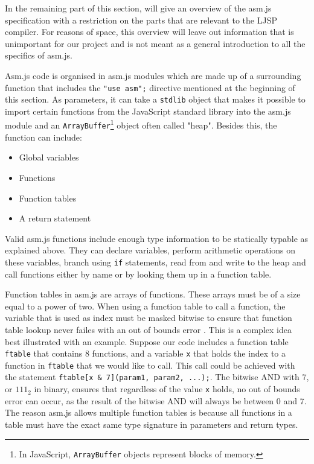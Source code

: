 \documentclass[11pt]{report}
\begin{document}
In the remaining part of this section, will give an overview of the asm.js specification with a restriction on the parts that are relevant to the LJSP compiler. For reasons of space, this overview will leave out information that is unimportant for our project and is not meant as a general introduction to all the specifics of asm.js.

Asm.js code is organised in asm.js modules which are made up of a surrounding function that includes the \texttt{"use asm";} directive mentioned at the beginning of this section. As parameters, it can take a \texttt{stdlib} object that makes it possible to import certain functions from the JavaScript standard library into the asm.js module and an \texttt{ArrayBuffer}\footnote{In JavaScript, \texttt{ArrayBuffer} objects represent blocks of memory.} object often called "heap". Besides this, the function can include:
\begin{itemize}
\item Global variables
\item Functions
\item Function tables
\item A return statement
\end{itemize}

Valid asm.js functions include enough type information to be statically typable as explained above. They can declare variables, perform arithmetic operations on these variables, branch using \texttt{if} statements, read from and write to the heap and call functions either by name or by looking them up in a function table.

Function tables in asm.js are arrays of functions. These arrays must be of a size equal to a power of two. When using a function table to call a function, the variable that is used as index must be masked bitwise to ensure that function table lookup never failes with an out of bounds error \cite{asmjspdf}. This is a complex idea best illustrated with an example. Suppose our code includes a function table \texttt{ftable} that contains $8$ functions, and a variable \texttt{x} that holds the index to a function in \texttt{ftable} that we would like to call. This call could be achieved with the statement \texttt{ftable[x \& 7](param1, param2, ...);}. The bitwise AND with $7$, or $111_2$ in binary, ensures that regardless of the value \texttt{x} holds, no out of bounds error can occur, as the result of the bitwise AND will always be between 0 and 7. The reason asm.js allows multiple function tables is because all functions in a table must have the exact same type signature in parameters and return types.
\end{document}
